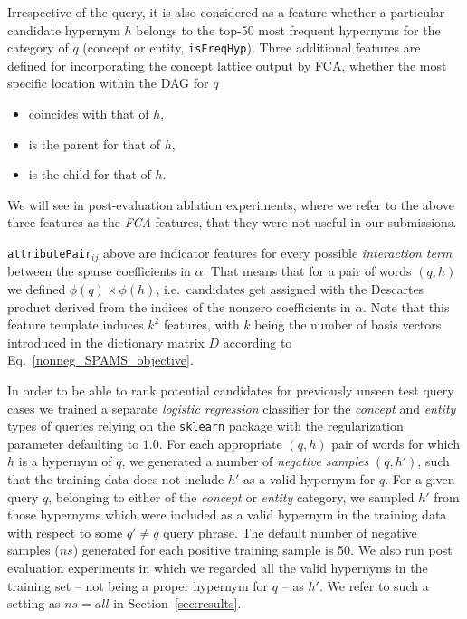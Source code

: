 \documentclass[11pt,a4paper]{article}
\begin{document}
Irrespective of the query, it is also considered as a feature whether a
particular candidate hypernym $h$ belongs to the top-50 most frequent hypernyms
for the category of $q$ (concept or entity, \texttt{isFreqHyp}).
Three additional features are defined for incorporating the concept lattice
output by FCA, whether the most specific location within the DAG for $q$
\begin{itemize}
	\item coincides with that of $h$,
	\item is the parent for that of $h$,
	\item is the child for that of $h$.
\end{itemize}
We will see in post-evaluation ablation experiments, where we refer to the
above three features as the \emph{FCA} features, that they were not useful in
our submissions.

\texttt{attributePair}$_{ij}$ above are indicator features for every possible
\emph{interaction term}
between the sparse coefficients in $\alpha$. That means that for a pair of
words $(q, h)$ we defined $\phi(q) \times \phi(h)$, i.e.~candidates
get assigned with the Descartes product derived from the indices of the nonzero
coefficients in $\alpha$. Note that this feature template induces $k^2$
features, with $k$ being the number of basis vectors introduced in the dictionary matrix $D$ according to Eq.~\ref{nonneg_SPAMS_objective}.

In order to be able to rank potential candidates for previously unseen test
query cases we trained a separate \emph{logistic regression} classifier for the
\textit{concept} and \textit{entity} types of queries relying on the
\texttt{sklearn} package with the regularization parameter defaulting to $1.0$.
For each appropriate $(q,h)$ pair of words for which
$h$ is a hypernym of $q$, we generated a number of \emph{negative samples} $(q, h')$,
such that the training data does not include $h'$ as a valid hypernym for $q$.
For a given query $q$, belonging to either of the \textit{concept} or
\textit{entity} category, we sampled $h'$ from those hypernyms which were
included as a valid hypernym in the training data with respect to some $q' \neq
q$ query phrase. The default number of negative samples ($ns$) generated for
each
positive training sample is 50. We also run post evaluation experiments in
which we regarded all the valid hypernyms in the training set -- not being a
proper hypernym for $q$ -- as $h'$. We refer to such a setting as $ns=all$ in
Section~\ref{sec:results}.
\end{document}

